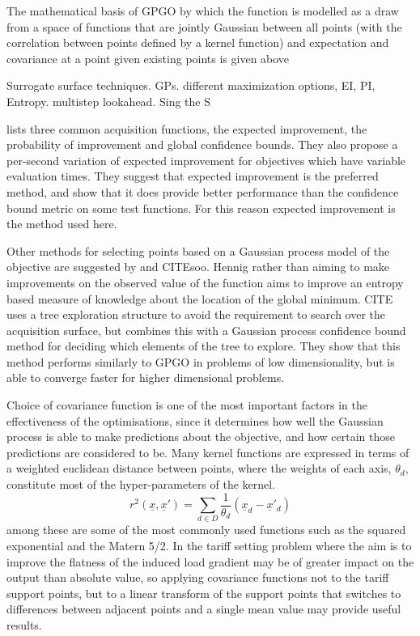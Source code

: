 \documentclass[a4paper, 10 pt, conference]{ieeeconf}  %
\begin{document}
The mathematical basis of GPGO by which the function is modelled as a draw from a space of functions that are jointly Gaussian between all points (with the correlation between points defined by a kernel function) and expectation and covariance at a point given existing points is given above

Surrogate surface techniques. GPs. different maximization options, EI, PI, Entropy. multistep lookahead. Sing the S

\cite{snoek2012practical} lists three common acquisition functions, the expected improvement, the probability of improvement and global confidence bounds. They also propose a per-second variation of expected improvement for objectives which have variable evaluation times. They suggest that expected improvement is the preferred method, and show that it does provide better performance than the confidence bound metric on some test functions. For this reason expected improvement is the method used here.

Other methods for selecting points based on a Gaussian process model of the objective are suggested by \cite{hennig2012entropy} and CITEsoo. Hennig rather than aiming to make improvements on the observed value of the function aims to improve an entropy based measure of knowledge about the location of the global minimum. CITE uses a tree exploration structure to avoid the requirement to search over the acquisition surface, but combines this with a Gaussian process confidence bound method for deciding which elements of the tree to explore. They show that this method performs similarly to GPGO in problems of low dimensionality, but is able to converge faster for higher dimensional problems.

Choice of covariance function is one of the most important factors in the effectiveness of the optimisations, since it determines how well the Gaussian process is able to make predictions about the objective, and how certain those predictions are considered to be. Many kernel functions are expressed in terms of a weighted euclidean distance between points, where the weights of each axis, $\theta_{d}$, constitute most of the hyper-parameters of the kernel.
\begin{equation}
r^{2}(\underline{x},\underline{x}') = \sum_{d \in D}\frac{1}{\theta_{d}}(\underline{x}_{d}-\underline{x}'_{d}) 
\end{equation}
among these are some of the most commonly used functions such as the squared exponential and the Matern 5/2. In the tariff setting problem where the aim is to improve the flatness of the induced load gradient may be of greater impact on the output than absolute value, so applying covariance functions not to the tariff support points, but to a linear transform of the support points that switches to differences between adjacent points and a single mean value may provide useful results.
\end{document}
